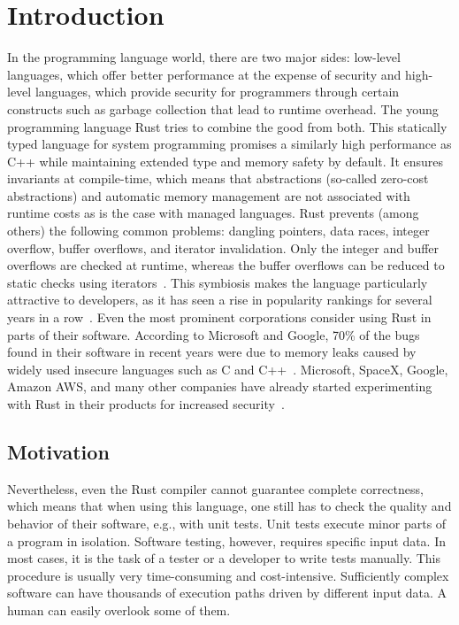 \documentclass[paper=a4,%
  twoside,%
  BCOR4mm,%
  abstract=true,%
  toc=bibliography,%
  chapterprefix=true,%
  toc=bibliographynumbered,%
  open=right,%
  english,%
  pagesize=pdftex]{scrreprt}
\begin{document}
\chapter{Introduction}
\label{chap:introduction}
In the programming language world, there are two major sides: low-level languages, which offer better performance at the expense of security and high-level languages, which provide security for programmers through certain constructs such as garbage collection that lead to runtime overhead. The young programming language Rust tries to combine the good from both. This statically typed language for system programming promises a similarly high performance as C++ while maintaining extended type and memory safety by default. It ensures invariants at compile-time, which means that abstractions (so-called zero-cost abstractions) and automatic memory management are not associated with runtime costs as is the case with managed languages. Rust prevents (among others) the following common problems: dangling pointers, data races, integer overflow, buffer overflows, and iterator invalidation. Only the integer and buffer overflows are checked at runtime, whereas the buffer overflows can be reduced to static checks using iterators~\cite{Anderson2016}. This symbiosis makes the language particularly attractive to developers, as it has seen a rise in popularity rankings for several years in a row~\cite{StackOverflow2020}. Even the most prominent corporations consider using Rust in parts of their software. According to Microsoft and Google, 70\% of the bugs found in their software in recent years were due to memory leaks caused by widely used insecure languages such as C and C++~\cite{Microsoft2019MemoryBugs, RustInAndroid}. Microsoft, SpaceX, Google, Amazon AWS, and many other companies have already started experimenting with Rust in their products for increased security~\cite{MicrosoftJoinsRust, AmazonLovesRust, RustInAndroid, GoogleRustFoundation}.

\section{Motivation}
Nevertheless, even the Rust compiler cannot guarantee complete correctness, which means that when using this language, one still has to check the quality and behavior of their software, e.g., with unit tests. Unit tests execute minor parts of a program in isolation. Software testing, however, requires specific input data. In most cases, it is the task of a tester or a developer to write tests manually. This procedure is usually very time-consuming and cost-intensive. Sufficiently complex software can have thousands of execution paths driven by different input data. A human can easily overlook some of them.
\end{document}
